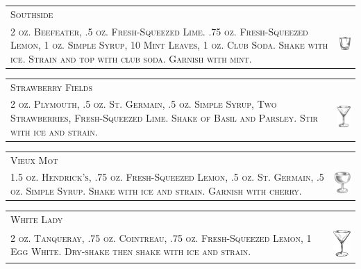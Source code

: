 \documentclass{article}
\begin{document}
\begin{tabular}{b{2.5in} m{0.625in}}
  \multicolumn{2}{p{3.5in}}{\centering\Huge\textsc{Southside}} \\ 
  \textsc{2 oz. Beefeater, .5 oz. Fresh-Squeezed Lime. .75 oz. Fresh-Squeezed
  Lemon, 1 oz. Simple Syrup, 10 Mint Leaves, 1 oz. Club Soda. Shake with
  ice. Strain and top with club soda. Garnish with mint.} &
  \includegraphics[width=0.5in]{rocks_glass.png}
\end{tabular}

\begin{tabular}{b{2.5in} m{0.625in}}
  \multicolumn{2}{p{3.5in}}{\centering\Huge\textsc{Strawberry Fields}} \\ 
  \textsc{2 oz. Plymouth, .5 oz. St. Germain, .5 oz. Simple Syrup, Two Strawberries,
  Fresh-Squeezed Lime. Shake of Basil and Parsley. Stir with ice and strain.} &
  \includegraphics[width=0.5in]{goblet.png}
\end{tabular}

\begin{tabular}{b{2.5in} m{0.625in}}
  \multicolumn{2}{p{3.5in}}{\centering\Huge\textsc{Vieux Mot}} \\ 
  \textsc{1.5 oz. Hendrick's, .75 oz. Fresh-Squeezed Lemon, .5 oz. St. Germain,
  .5 oz. Simple Syrup. Shake with ice and strain. Garnish with cherry.} &
  \includegraphics[width=0.5in]{coupe.png}
\end{tabular}

\begin{tabular}{b{2.5in} m{0.625in}}
  \multicolumn{2}{p{3.5in}}{\centering\Huge\textsc{White Lady}} \\ 
  \textsc{2 oz. Tanqueray, .75 oz. Cointreau, .75 oz. Fresh-Squeezed Lemon,
  1 Egg White. Dry-shake then shake with ice and strain.} &
  \includegraphics[width=0.5in]{goblet.png}
\end{tabular}
\end{document}
